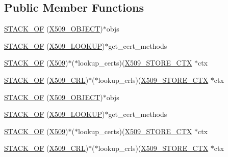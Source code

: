 \subsection*{Public Member Functions}
\begin{DoxyCompactItemize}
\item 
\hyperlink{structx509__store__st_aaaf8c71b73743d46dd0636b8490c6275}{S\+T\+A\+C\+K\+\_\+\+OF} (\hyperlink{crypto_2x509_2x509__vfy_8h_a49c000712efcfeff1e403cb1242052e9}{X509\+\_\+\+O\+B\+J\+E\+CT})$\ast$objs
\item 
\hyperlink{structx509__store__st_a9956bdd48f9f8886850c90701ffe9bfc}{S\+T\+A\+C\+K\+\_\+\+OF} (\hyperlink{crypto_2x509_2x509__vfy_8h_afcefc7fb9c7573debf6c1d28b28ff618}{X509\+\_\+\+L\+O\+O\+K\+UP})$\ast$get\+\_\+cert\+\_\+methods
\item 
\hyperlink{structx509__store__st_ab655f200d55c97ff0ce135f73c380ee0}{S\+T\+A\+C\+K\+\_\+\+OF} (\hyperlink{crypto_2ossl__typ_8h_a4f666bde6518f95deb3050c54b408416}{X509})$\ast$($\ast$lookup\+\_\+certs)(\hyperlink{crypto_2ossl__typ_8h_ae681945a2cf88d6337137dc0260a1545}{X509\+\_\+\+S\+T\+O\+R\+E\+\_\+\+C\+TX} $\ast$ctx
\item 
\hyperlink{structx509__store__st_ad960bc9ea0ddcd853b39bfb99f6af6e0}{S\+T\+A\+C\+K\+\_\+\+OF} (\hyperlink{crypto_2ossl__typ_8h_ac8661d2485c2c8da5fd7dd26b846f4bf}{X509\+\_\+\+C\+RL})$\ast$($\ast$lookup\+\_\+crls)(\hyperlink{crypto_2ossl__typ_8h_ae681945a2cf88d6337137dc0260a1545}{X509\+\_\+\+S\+T\+O\+R\+E\+\_\+\+C\+TX} $\ast$ctx
\item 
\hyperlink{structx509__store__st_aaaf8c71b73743d46dd0636b8490c6275}{S\+T\+A\+C\+K\+\_\+\+OF} (\hyperlink{crypto_2x509_2x509__vfy_8h_a49c000712efcfeff1e403cb1242052e9}{X509\+\_\+\+O\+B\+J\+E\+CT})$\ast$objs
\item 
\hyperlink{structx509__store__st_a9956bdd48f9f8886850c90701ffe9bfc}{S\+T\+A\+C\+K\+\_\+\+OF} (\hyperlink{crypto_2x509_2x509__vfy_8h_afcefc7fb9c7573debf6c1d28b28ff618}{X509\+\_\+\+L\+O\+O\+K\+UP})$\ast$get\+\_\+cert\+\_\+methods
\item 
\hyperlink{structx509__store__st_ab655f200d55c97ff0ce135f73c380ee0}{S\+T\+A\+C\+K\+\_\+\+OF} (\hyperlink{crypto_2ossl__typ_8h_a4f666bde6518f95deb3050c54b408416}{X509})$\ast$($\ast$lookup\+\_\+certs)(\hyperlink{crypto_2ossl__typ_8h_ae681945a2cf88d6337137dc0260a1545}{X509\+\_\+\+S\+T\+O\+R\+E\+\_\+\+C\+TX} $\ast$ctx
\item 
\hyperlink{structx509__store__st_ad960bc9ea0ddcd853b39bfb99f6af6e0}{S\+T\+A\+C\+K\+\_\+\+OF} (\hyperlink{crypto_2ossl__typ_8h_ac8661d2485c2c8da5fd7dd26b846f4bf}{X509\+\_\+\+C\+RL})$\ast$($\ast$lookup\+\_\+crls)(\hyperlink{crypto_2ossl__typ_8h_ae681945a2cf88d6337137dc0260a1545}{X509\+\_\+\+S\+T\+O\+R\+E\+\_\+\+C\+TX} $\ast$ctx
\end{DoxyCompactItemize}
